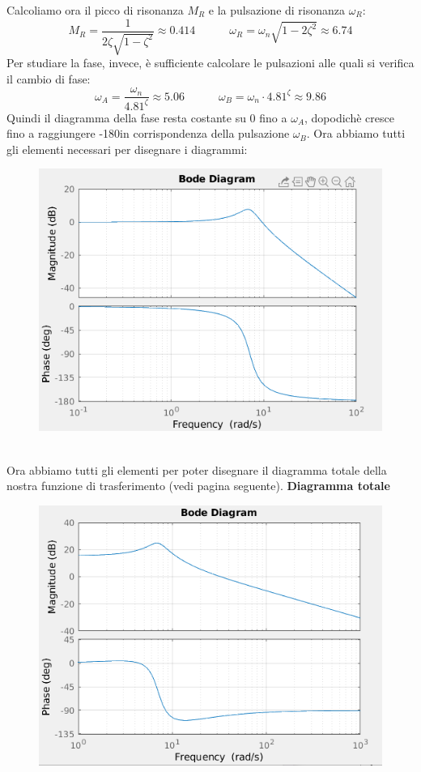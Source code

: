 \documentclass[12pt,a4paper]{article}
\begin{document}
\begin{itemize}
		Calcoliamo ora il picco di risonanza $M_R$ e la pulsazione di risonanza $\omega_R$:
		\[
			M_R = \frac{1}{2\zeta\sqrt{1-\zeta^2}} \approx 0.414\quad\quad\quad\omega_R = \omega_n\sqrt{1-2\zeta^2} \approx 6.74
		\]
		Per studiare la fase, invece, \`e sufficiente calcolare le pulsazioni alle quali si verifica il cambio di fase:
		\[
			\omega_A = \frac{\omega_n}{4.81^\zeta} \approx 5.06\quad\quad\quad\omega_B = \omega_n \cdot 4.81^\zeta \approx 9.86
		\]
		Quindi il diagramma della fase resta costante su 0 fino a $\omega_A$, dopodich\`e cresce fino a raggiungere -180\degree in corrispondenza della pulsazione $\omega_B$.
		Ora abbiamo tutti gli elementi necessari per disegnare i diagrammi:\vspace{10px}
		\begin{figure}[h!]
			\centering
			\includegraphics[scale=0.5]{./images/bode44_3.png}
		\end{figure}
		\\Ora abbiamo tutti gli elementi per poter disegnare il diagramma totale della nostra funzione di trasferimento (vedi pagina seguente).
		\newpage
		\textbf{Diagramma totale}
		\begin{figure}[h!]
			\centering
			\includegraphics[scale=0.6]{./images/bode44tot.png}
		\end{figure}
	\end{itemize}
	\newpage
\end{document}
